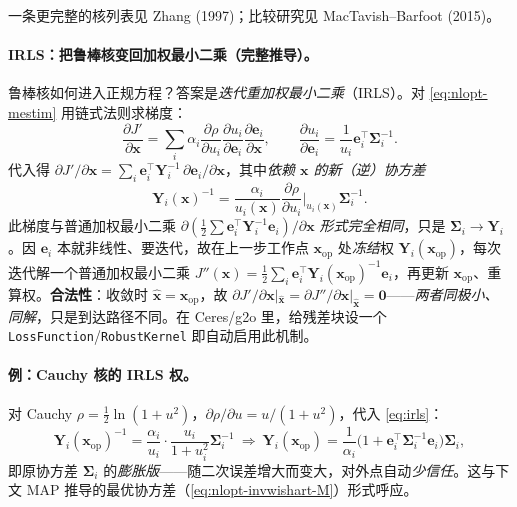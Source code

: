 一条更完整的核列表见 Zhang (1997)\cite{zhang1997parameter}；比较研究见 MacTavish--Barfoot (2015)。

\paragraph{IRLS：把鲁棒核变回加权最小二乘（完整推导）。}\cite{barfoot2024state,carlone2026handbook}
鲁棒核如何进入正规方程？答案是\emph{迭代重加权最小二乘}（IRLS）。对 \cref{eq:nlopt-mestim} 用链式法则求梯度：
\begin{equation}
  \frac{\partial J'}{\partial\mathbf{x}}=\sum_i\alpha_i\frac{\partial\rho}{\partial u_i}\frac{\partial u_i}{\partial\mathbf{e}_i}\frac{\partial\mathbf{e}_i}{\partial\mathbf{x}},
  \qquad \frac{\partial u_i}{\partial\mathbf{e}_i}=\frac{1}{u_i}\mathbf{e}_i^\top\boldsymbol{\Sigma}_i^{-1}.
  \label{eq:nlopt-irls-grad}
\end{equation}
代入得 $\partial J'/\partial\mathbf{x}=\sum_i\mathbf{e}_i^\top\mathbf{Y}_i^{-1}\,\partial\mathbf{e}_i/\partial\mathbf{x}$，其中\emph{依赖 $\mathbf{x}$ 的新（逆）协方差}
\begin{equation}
  \mathbf{Y}_i(\mathbf{x})^{-1}=\frac{\alpha_i}{u_i(\mathbf{x})}\frac{\partial\rho}{\partial u_i}\Big|_{u_i(\mathbf{x})}\boldsymbol{\Sigma}_i^{-1}.
  \label{eq:irls}
\end{equation}
此梯度与普通加权最小二乘 $\partial(\tfrac12\sum\mathbf{e}_i^\top\mathbf{Y}_i^{-1}\mathbf{e}_i)/\partial\mathbf{x}$ \emph{形式完全相同}，只是 $\boldsymbol{\Sigma}_i\to\mathbf{Y}_i$。因 $\mathbf{e}_i$ 本就非线性、要迭代，故在上一步工作点 $\mathbf{x}_{\mathrm{op}}$ 处\emph{冻结}权 $\mathbf{Y}_i(\mathbf{x}_{\mathrm{op}})$，每次迭代解一个普通加权最小二乘 $J''(\mathbf{x})=\tfrac12\sum_i\mathbf{e}_i^\top\mathbf{Y}_i(\mathbf{x}_{\mathrm{op}})^{-1}\mathbf{e}_i$，再更新 $\mathbf{x}_{\mathrm{op}}$、重算权。\textbf{合法性}：收敛时 $\hat{\mathbf{x}}=\mathbf{x}_{\mathrm{op}}$，故 $\partial J'/\partial\mathbf{x}|_{\hat{\mathbf{x}}}=\partial J''/\partial\mathbf{x}|_{\hat{\mathbf{x}}}=\mathbf{0}$——\emph{两者同极小、同解}，只是到达路径不同。在 Ceres/g2o 里，给残差块设一个 \texttt{LossFunction}/\texttt{RobustKernel} 即自动启用此机制。

\paragraph{例：Cauchy 核的 IRLS 权。}\cite{barfoot2024state}
对 Cauchy $\rho=\tfrac12\ln(1+u^2)$，$\partial\rho/\partial u=u/(1+u^2)$，代入 \cref{eq:irls}：
\begin{equation}
  \mathbf{Y}_i(\mathbf{x}_{\mathrm{op}})^{-1}=\frac{\alpha_i}{u_i}\cdot\frac{u_i}{1+u_i^2}\boldsymbol{\Sigma}_i^{-1}
  \ \Rightarrow\ \mathbf{Y}_i(\mathbf{x}_{\mathrm{op}})=\frac{1}{\alpha_i}\big(1+\mathbf{e}_i^\top\boldsymbol{\Sigma}_i^{-1}\mathbf{e}_i\big)\boldsymbol{\Sigma}_i,
  \label{eq:nlopt-cauchy-Y}
\end{equation}
即原协方差 $\boldsymbol{\Sigma}_i$ 的\emph{膨胀版}——随二次误差增大而变大，对外点自动\emph{少信任}。这与下文 MAP 推导的最优协方差（\cref{eq:nlopt-invwishart-M}）形式呼应。

